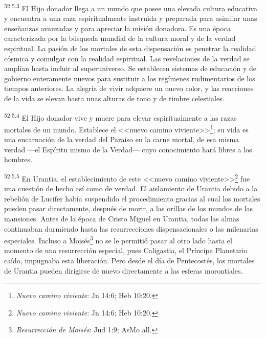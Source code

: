 \par
\textsuperscript{52:5.3} El Hijo donador llega a un mundo que posee una elevada cultura educativa y encuentra a una raza espiritualmente instruida y preparada para asimilar unas enseñanzas avanzadas y para apreciar la misión donadora. Es una época caracterizada por la búsqueda mundial de la cultura moral y de la verdad espiritual. La pasión de los mortales de esta dispensación es penetrar la realidad cósmica y comulgar con la realidad espiritual. Las revelaciones de la verdad se amplían hasta incluir al superuniverso. Se establecen sistemas de educación y de gobierno enteramente nuevos para sustituir a los regímenes rudimentarios de los tiempos anteriores. La alegría de vivir adquiere un nuevo color, y las reacciones de la vida se elevan hasta unas alturas de tono y de timbre celestiales.

\par
\textsuperscript{52:5.4} El Hijo donador vive y muere para elevar espiritualmente a las razas mortales de un mundo. Establece el <<nuevo camino viviente>>\footnote{\textit{Nuevo camino viviente}: Jn 14:6; Heb 10:20.}; su vida es una encarnación de la verdad del Paraíso en la carne mortal, de esa misma verdad ---el Espíritu mismo de la Verdad--- cuyo conocimiento hará libres a los hombres.

\par
\textsuperscript{52:5.5} En Urantia, el establecimiento de este <<nuevo camino viviente>>\footnote{\textit{Nuevo camino viviente}: Jn 14:6; Heb 10:20.} fue una cuestión de hecho así como de verdad. El aislamiento de Urantia debido a la rebelión de Lucifer había suspendido el procedimiento gracias al cual los mortales pueden pasar directamente, después de morir, a las orillas de los mundos de las mansiones. Antes de la época de Cristo Miguel en Urantia, todas las almas continuaban durmiendo hasta las resurrecciones dispensacionales o las milenarias especiales. Incluso a Moisés\footnote{\textit{Resurrección de Moisés}: Jud 1:9; AsMo all.} no se le permitió pasar al otro lado hasta el momento de una resurrección especial, pues Caligastia, el Príncipe Planetario caído, impugnaba esta liberación. Pero desde el día de Pentecostés, los mortales de Urantia pueden dirigirse de nuevo directamente a las esferas morontiales.

